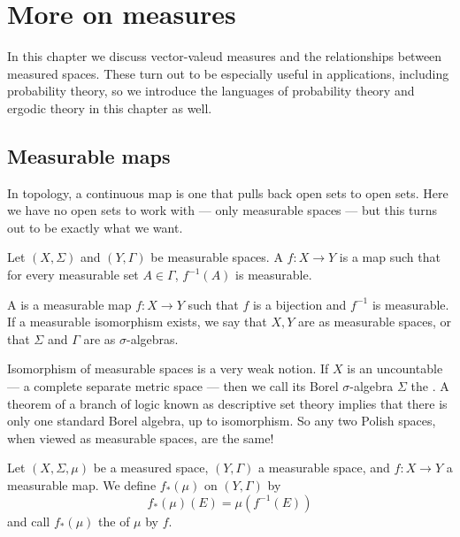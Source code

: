 
\chapter{More on measures}
In this chapter we discuss vector-valeud measures and the relationships between measured spaces.
These turn out to be especially useful in applications, including probability theory, so we introduce the languages of probability theory and ergodic theory in this chapter as well.

\section{Measurable maps}
In topology, a continuous map is one that pulls back open sets to open sets.
Here we have no open sets to work with --- only measurable spaces --- but this turns out to be exactly what we want.

\begin{definition}
Let $(X, \Sigma)$ and $(Y, \Gamma)$ be measurable spaces.
A  $f: X \to Y$ is a map such that for every measurable set $A \in \Gamma$, $f^{-1}(A)$ is measurable.

A  is a measurable map $f: X \to Y$ such that $f$ is a bijection and $f^{-1}$ is measurable.
If a measurable isomorphism exists, we say that $X,Y$ are  as measurable spaces, or that $\Sigma$ and $\Gamma$ are  as $\sigma$-algebras.
\end{definition}

\begin{example}
Isomorphism of measurable spaces is a very weak notion.
If $X$ is an uncountable  --- a complete separate metric space --- then we call its Borel $\sigma$-algebra $\Sigma$ the .
A theorem of a branch of logic known as descriptive set theory implies that there is only one standard Borel algebra, up to isomorphism.
So any two Polish spaces, when viewed as measurable spaces, are the same!
\end{example}

\begin{definition}
Let $(X, \Sigma, \mu)$ be a measured space, $(Y, \Gamma)$ a measurable space, and $f: X \to Y$ a measurable map.
We define $f_{*}(\mu)$ on $(Y, \Gamma)$ by
\[f_{*}(\mu)(E) = \mu(f^{-1}(E))\]
and call $f_{*}(\mu)$ the  of $\mu$ by $f$.
\end{definition}

